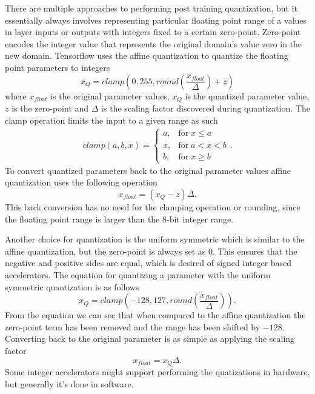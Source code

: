 \documentclass[12pt,a4paper,english
]{tunithesis}
\begin{document}
There are multiple approaches to performing post training quantization, but it essentially always involves representing particular floating point range of a values in layer inputs or outputs with integers fixed to a certain zero-point. Zero-point encodes the integer value that represents the original domain's value zero in the new domain. Tensorflow uses the affine quantization to quantize the floating point parameters to integers
\begin{equation}
x_{Q} = clamp(0, 255, round(\frac{x_{float}}{\Delta}) + z)
\end{equation}
where $x_{float}$ is the original parameter values, $x_{Q}$ is the quantized parameter value, $z$ is the zero-point and $\Delta$ is the scaling factor discovered during quantization.
The clamp operation limits the input to a given range as such
\begin{align}
  \label{eq:clamp}
clamp(a, b, x) =
  \begin{cases}
    a, & \text{for} \; x \leq a  \\
                x, & \text{for} \; a < x < b  \\
                b, & \text{for} \; x \geq b
  \end{cases}.
\end{align}
To convert quantized parameters back to the original parameter values affine quantization uses the following operation
\begin{equation}
x_{float} = (x_{Q}-z)\Delta.
\end{equation}
This back conversion has no need for the clamping operation or rounding, since the floating point range is larger than the 8-bit integer range.

Another choice for quantization is the uniform symmetric which is similar to the affine quantization, but the zero-point is always set as 0. This ensures that the negative and positive sides are equal, which is desired of signed integer based accelerators. The equation for quantizing a parameter with the uniform symmetric quantization is as follows
\begin{equation}
x_{Q} = clamp(-128, 127, round(\frac{x_{float}}{\Delta})).
\end{equation}
From the equation we can see that when compared to the affine quantization the zero-point term has been removed and the range has been shifted by $-128$. Converting back to the original parameter is as simple as applying the scaling factor
\begin{equation}
x_{float} = x_{Q}\Delta.
\end{equation}
Some integer accelerators might support performing the quatizations in hardware, but generally it's done in software.
\end{document}
